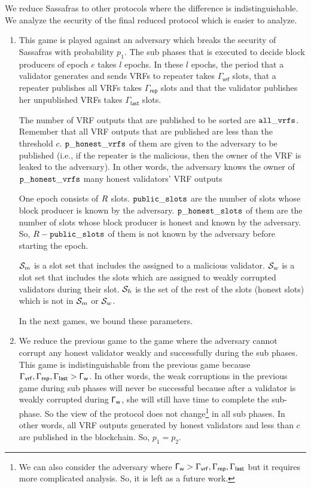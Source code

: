 We reduce Sassafras to other protocols where the difference is indistinguishable. We analyze the security of the final reduced protocol which is easier to analyze.
\begin{enumerate}[label={{Game }}{{\arabic*}}]	
	\item This game is played against an adversary which breaks the security of  Sassafras with probability $ p_1 $. The sub phases that is executed to decide block producers of epoch $ e $ takes $ l $ epochs.	
	 In these $ l $ epochs, the period that a validator generates and sends VRFs to repeater takes $ \Gamma_{\mathsf{vrf}} $ slots, that a repeater publishes all VRFs takes $ \Gamma_{\mathsf{rep}} $ slots and that the validator publishes her unpublished VRFs takes $ \Gamma_{\mathsf{last}} $ slots. 
	 
	 
	
	 The number of VRF outputs that are published to be sorted are $ \mathtt{all\_vrfs} $. Remember that all VRF outputs that are published are less than the threshold $ c $. $ \mathtt{p\_honest\_vrfs} $ of them are given to the adversary to be published (i.e., if the repeater is the malicious, then the owner of the VRF is leaked to the adversary). In other words, the adversary knows the owner of $ \mathtt{p\_honest\_vrfs} $ many honest validators' VRF outputs
	 
	 One epoch consists of $ R  $ slots. $ \mathtt{public\_slots} $ are the number of slots whose block producer is known by the adversary. $ \mathtt{p\_honest\_slots} $ of them are the number of slots whose block producer is honest and known by the adversary. So, $ R  - \mathtt{public\_slots} $ of them is not known by the adversary before starting the epoch.
	 
	 $ \mathcal{S}_m $ is a slot set that includes the assigned to a malicious validator. $ \mathcal{S}_w $ is a slot set that includes the slots which are assigned to weakly corrupted validators during their slot. $ \mathcal{S}_h $ is the set of the rest of the slots (honest slots) which is not in $ \mathcal{S}_m $ or $ \mathcal{S}_w $. 
	  
	 In the next games, we bound these parameters.
	
	\item We reduce the previous game to the game where the adversary cannot corrupt  any honest validator weakly and successfully during the sub phases. This game is indistinguishable from the previous game  because $ \Gamma_{\mathsf{vrf}}, \Gamma_{\mathsf{rep}}, \Gamma_{\mathsf{last}}> \mathsf{\Gamma_{w}} $. In other words, the weak corruptions in the previous game during sub phases will never be successful because after a validator is weakly corrupted during $\mathsf{\Gamma_{w}} $, she will still have time to complete the sub-phase. So the view of the protocol does not change\footnote{We can also consider the adversary where $ \mathsf{\Gamma_{w}} > \Gamma_{\mathsf{vrf}}, \Gamma_{\mathsf{rep}}, \Gamma_{\mathsf{last}} $ but it requires more complicated analysis. So, it is left as a future work.} in all sub phases. In other words, all VRF outputs generated by honest validators and less than $ c $ are published in the blockchain. So, $ p_1 = p_2 $.
	

\end{enumerate}
